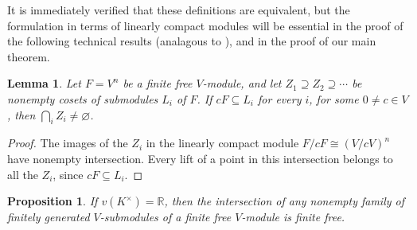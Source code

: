 \documentclass[12pt]{amsart}
\newtheorem{proposition}[theorem]{Proposition}
\newtheorem{lemma}[theorem]{Lemma}
\theoremstyle{plain}
\begin{document}
It is immediately verified that these definitions are equivalent, but the formulation in terms of linearly compact modules will be essential in the proof of the following technical results (analagous to \cite[Lemma 2.1 and Lemma 2.2]{Wang}), and in the proof of our main theorem.


\begin{lemma}\label{am:affine}
Let $F=V^n$ be a finite free $V$-module, and let
$Z_1\supseteq Z_2\supseteq\cdots$ be nonempty cosets of submodules $L_i$
of $F$. If $cF\subseteq L_i$ for every $i$, for some $0\ne c\in V$,
then $\bigcap_i Z_i\ne\varnothing$.
\end{lemma}

\begin{proof}
The images of the $Z_i$ in the linearly compact module $F/cF\cong (V/cV)^n$ have
nonempty intersection. Every lift of a point in this intersection
belongs to all the $Z_i$, since $cF\subseteq L_i$.
\end{proof}

\begin{proposition}\label{am:lattices}
If $v(K^\times)=\mathbb{R}$, then the intersection of any nonempty family of finitely generated $V$-submodules of a finite free $V$-module is finite free.
\end{proposition}
\end{document}
